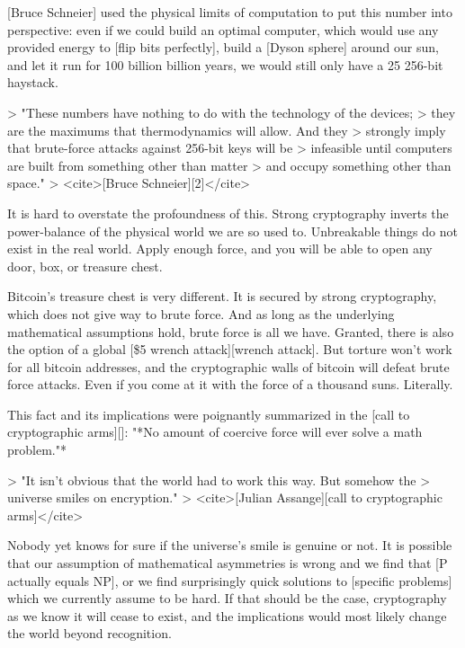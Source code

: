 {{%

[Bruce Schneier] used the physical limits of computation to put this
number into perspective: even if we could build an optimal computer,
which would use any provided energy to [flip bits perfectly], build a
[Dyson sphere] around our sun, and let it run for 100 billion billion
years, we would still only have a 25%
256-bit haystack.

> "These numbers have nothing to do with the technology of the devices;
> they are the maximums that thermodynamics will allow. And they
> strongly imply that brute-force attacks against 256-bit keys will be
> infeasible until computers are built from something other than matter
> and occupy something other than space."
> <cite>[Bruce Schneier][2]</cite>

It is hard to overstate the profoundness of this. Strong cryptography
inverts the power-balance of the physical world we are so used to.
Unbreakable things do not exist in the real world. Apply enough force,
and you will be able to open any door, box, or treasure chest.

Bitcoin's treasure chest is very different. It is secured by strong
cryptography, which does not give way to brute force. And as long as the
underlying mathematical assumptions hold, brute force is all we have.
Granted, there is also the option of a global [\$5 wrench attack][wrench attack].
But torture won't work for all bitcoin addresses, and the cryptographic
walls of bitcoin will defeat brute force attacks. Even if you come at it
with the force of a thousand suns. Literally.

This fact and its implications were poignantly summarized in the [call
to cryptographic arms][]: "*No amount of coercive force will ever solve
a math problem."*

> "It isn't obvious that the world had to work this way. But somehow the
> universe smiles on encryption."
> <cite>[Julian Assange][call to cryptographic arms]</cite>

Nobody yet knows for sure if the universe's smile is genuine or not. It
is possible that our assumption of mathematical asymmetries is wrong and
we find that [P actually equals NP], or we find surprisingly quick
solutions to [specific problems] which we currently assume to be hard.
If that should be the case, cryptography as we know it will cease to
exist, and the implications would most likely change the world beyond
recognition.

}}
